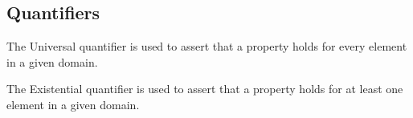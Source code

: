 \subsection{Quantifiers}
\begin{definition}
    The Universal  quantifier is used to assert that a property holds for every element in a given domain. 
\end{definition}


\begin{definition}
    The Existential  quantifier is used to assert that a property holds for at least one element in a given domain. 
\end{definition}
\newpage